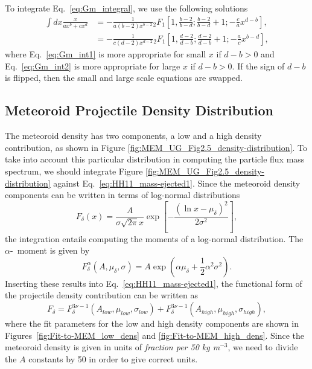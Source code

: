 \documentclass{hitec}
\numberwithin{equation}{section}
\begin{document}
To integrate Eq.\ \eqref{eq:Gm_integral}, we use the following solutions
\begin{align}\label{eq:Gm_int1}
\int dx\frac{x}{ax^b+cx^d} &= -\frac{1}{a(b-2)x^{b-2}} {}_2F_1\left[1, \frac{b-2}{b-d}; \frac{b-2}{b-d}+1; -\frac{c}{a}x^{d-b}\right],\\\label{eq:Gm_int2}
&= -\frac{1}{c(d-2)x^{d-2}} {}_2F_1\left[1, \frac{d-2}{d-b}; \frac{d-2}{d-b}+1; -\frac{a}{c}x^{b-d}\right],
\end{align}
where Eq.\ \ref{eq:Gm_int1} is more appropriate for small $x$ if $d-b > 0$ and Eq.\ \ref{eq:Gm_int2} is more appropriate for large $x$ if $d-b > 0$. If the sign of $d-b$ is flipped, then the small and large scale equations are swapped.


\subsection{Meteoroid Projectile Density Distribution}

The meteoroid density has two components, a low and a high density contribution, as shown in Figure \ref{fig:MEM_UG_Fig2.5_density-distribution}. To take into account this particular distribution in computing the particle flux mass spectrum, we should integrate Figure \ref{fig:MEM_UG_Fig2.5_density-distribution} against Eq.\ \ref{eq:HH11_mass-ejected1}. Since the meteoroid density components can be written in terms of log-normal distributions
\begin{equation}\label{eq:log-normal_distribution}
F_\delta(x) = \frac{A}{\sigma\sqrt{2\pi}x}\exp\left[-\frac{(\ln x-\mu_\delta)^2}{2\sigma^2}\right],
\end{equation}
the integration entails computing the moments of a log-normal distribution. The $\alpha$-~moment is given by
\begin{equation}\label{eq:log_normal-moment}
F^\alpha_\delta(A,\mu_\delta,\sigma) = A\exp\left(\alpha\mu_\delta+\frac{1}{2}\alpha^2\sigma^2\right).
\end{equation}
Inserting these results into Eq.\ \ref{eq:HH11_mass-ejected1}, the functional form of the projectile density contribution can be written as
\begin{equation}
F_\delta = F^{3\nu-1}_\delta(A_{low}, \mu_{low},\sigma_{low}) + F^{3\nu-1}_\delta(A_{high}, \mu_{high},\sigma_{high}),
\end{equation}
where the fit parameters for the low and high density components are shown in Figures~\ref{fig:Fit-to-MEM_low_dens} and \ref{fig:Fit-to-MEM_high_dens}. Since the meteoroid density is given in units of \textit{fraction per 50 kg m$^{-3}$}, we need to divide the $A$ constants by 50 in order to give correct units.
\end{document}
